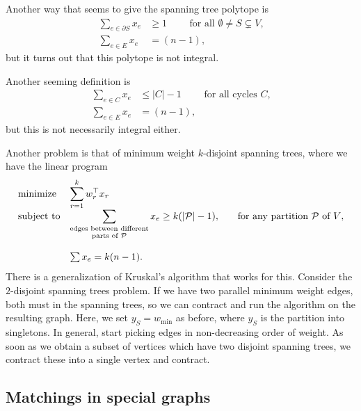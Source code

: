 	Another way that seems to give the spanning tree polytope is
	\begin{align*}
		\sum_{e \in \partial S} x_e &\ge 1 \qquad \text{ for all $\emptyset \ne S \subsetneq V$,} \\
		\sum_{e \in E} x_e &= (n-1),
	\end{align*}
	but it turns out that this polytope is not integral. %

	Another seeming definition is
	\begin{align*}
		\sum_{e \in C} x_e &\le |C|-1 \qquad \text{ for all cycles $C$,} \\
		\sum_{e \in E} x_e &= (n-1),
	\end{align*}
	but this is not necessarily integral either.

	Another problem is that of minimum weight $k$-disjoint spanning trees, where we have the linear program
	\[
	\begin{array}{ll@{}ll}
	\text{minimize}  & \displaystyle\sum_{r=1}^k w_r^\top x_r &\\
	\text{subject to}& \displaystyle\sum_{\substack{\text{edges between different}\\ \text{parts of $\mathcal{P}$}}} x_e \ge k(|\mathcal{P}|-1) ,  &\qquad \text{for any partition $\mathcal{P}$ of $V$},\\\\
	                 & \sum x_{e} = k(n-1). &
	\end{array}
	\]
	There is a generalization of Kruskal's algorithm that works for this. Consider the $2$-disjoint spanning trees problem. If we have two parallel minimum weight edges, both must in the spanning trees, so we can contract and run the algorithm on the resulting graph. Here, we set $y_S = w_{\operatorname{min}}$ as before, where $y_S$ is the partition into singletons. In general, start picking edges in non-decreasing order of weight. As soon as we obtain a subset of vertices which have two disjoint spanning trees, we contract these into a single vertex and contract. 

\subsection{Matchings in special graphs}


